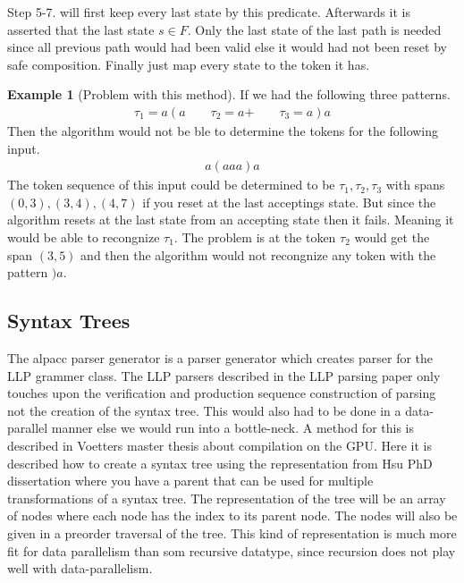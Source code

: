 \documentclass[a4paper,12pt]{article}
\theoremstyle{definition}
\newtheorem{example}{Example}[section]
\begin{document}
Step 5-7. will first keep every last state by this predicate. Afterwards it is asserted that the last state $s \in F$. Only the last state of the last path is needed since all previous path would had been valid else it would had not been reset by safe composition. Finally just map every state to the token it has.

\begin{example}[Problem with this method]
  If we had the following three patterns.
  \begin{align*}
    \tau_1 = a(a \qquad \tau_2 = a\text{+} \qquad \tau_3 = a)a
  \end{align*}
  Then the algorithm would not be ble to determine the tokens for the following input.
  \begin{align*}
    a(aaa)a
  \end{align*}
  The token sequence of this input could be determined to be $\tau_1, \tau_2, \tau_3$ with spans $(0, 3), (3, 4), (4, 7)$ if you reset at the last acceptings state. But since the algorithm resets at the last state from an accepting state then it fails. Meaning it would be able to recongnize $\tau_1$. The problem is at the token $\tau_2$ would get the span $(3, 5)$ and then the algorithm would not recongnize any token with the pattern $)a$.
\end{example}
\subsection{Syntax Trees}
The alpacc parser generator is a parser generator which creates parser for the LLP grammer class. The LLP parsers described in the LLP parsing paper \cite{Vagner2007} only touches upon the verification and production sequence construction of parsing not the creation of the syntax tree. This would also had to be done in a data-parallel manner else we would run into a bottle-neck. A method for this is described in Voetters master thesis \cite[32-33]{voetter2021} about compilation on the GPU. Here it is described how to create a syntax tree using the representation from Hsu PhD dissertation \cite[77-81]{hsu2019} where you have a parent that can be used for multiple transformations of a syntax tree. The representation of the tree will be an array of nodes where each node has the index to its parent node. The nodes will also be given in a preorder traversal of the tree. This kind of representation is much more fit for data parallelism than som recursive datatype, since recursion does not play well with data-parallelism.
\end{document}
